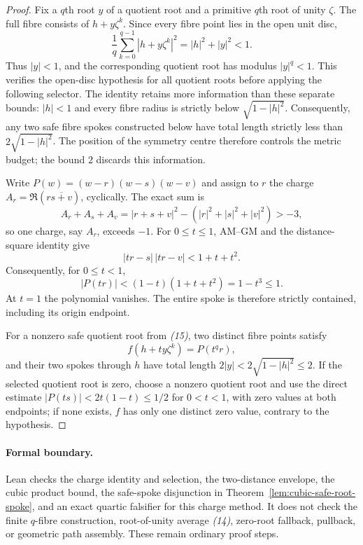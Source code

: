 \documentclass[11pt]{article}
\begin{document}
\begin{proof}
Fix a $q$th root $y$ of a quotient root and a primitive $q$th root of unity
$\zeta$.  The full fibre consists of $h+y\zeta^k$.  Since every fibre point
lies in the open unit disc,
\[
 \frac1q\sum_{k=0}^{q-1}|h+y\zeta^k|^2
   =|h|^2+|y|^2<1.                                \tag{14}
\]
Thus $|y|<1$, and the corresponding quotient root has modulus
$|y|^q<1$.  This verifies the open-disc hypothesis for all quotient roots
before applying the following selector.
The identity retains more information than these separate bounds:
$|h|<1$ and every fibre radius is strictly below $\sqrt{1-|h|^2}$.
Consequently, any two safe fibre spokes constructed below have total length
strictly less than $2\sqrt{1-|h|^2}$.  The position of the symmetry centre
therefore controls the metric budget; the bound $2$ discards this information.

Write $P(w)=(w-r)(w-s)(w-v)$ and assign to $r$ the charge
$A_r=\Re(r\overline{s+v})$, cyclically.  The exact sum is
\[
 A_r+A_s+A_v=|r+s+v|^2-(|r|^2+|s|^2+|v|^2)>-3,
\]
so one charge, say $A_r$, exceeds $-1$.  For $0\le t\le1$, AM--GM and the
distance-square identity give
\[
 |tr-s|\,|tr-v|<1+t+t^2.
\]
Consequently, for $0\le t<1$,
\[
 |P(tr)|<(1-t)(1+t+t^2)=1-t^3\le1.              \tag{15}
\]
At $t=1$ the polynomial vanishes.  The entire spoke is therefore strictly
contained, including its origin endpoint.

For a nonzero safe quotient root from \emph{(15)}, two distinct
fibre points satisfy
\[
 f(h+ty\zeta^k)=P(t^qr),
\]
and their two spokes through $h$ have total length
$2|y|<2\sqrt{1-|h|^2}\le2$.  If the selected
quotient root is zero, choose a nonzero quotient root and use the direct
estimate $|P(ts)|<2t(1-t)\le1/2$ for $0<t<1$, with zero values
at both endpoints; if none exists, $f$ has only one distinct
zero value, contrary to the hypothesis.
\end{proof}

\paragraph{Formal boundary.}
\label{rem:cubic-quotient-formal-boundary}
Lean checks the charge identity and selection, the two-distance envelope,
the cubic product bound, the safe-spoke disjunction in
Theorem~\ref{lem:cubic-safe-root-spoke}, and an exact quartic falsifier for
this charge method.  It does not check the finite $q$-fibre construction,
root-of-unity average \emph{(14)}, zero-root fallback, pullback, or geometric
path assembly.  These remain ordinary proof steps.
\end{document}
